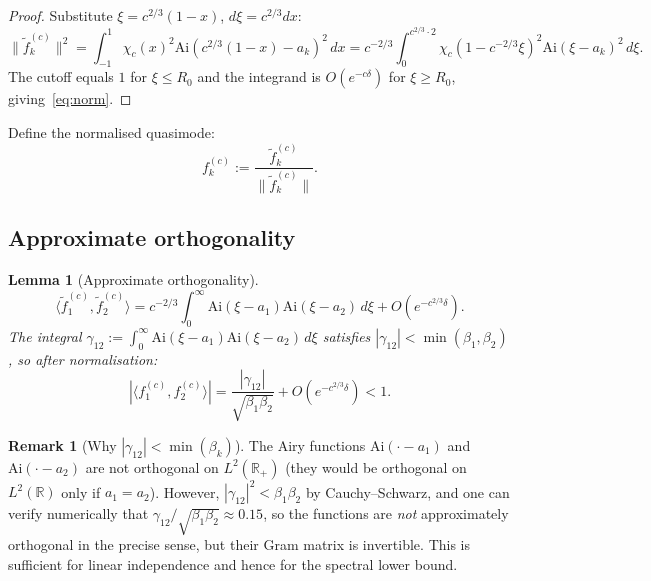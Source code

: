 \documentclass[12pt,a4paper]{amsart}
\newtheorem{lemma}[theorem]{Lemma}
\theoremstyle{definition}
\newtheorem{remark}[theorem]{Remark}
\newcommand{\Ai}{\mathrm{Ai}}
\newcommand{\R}{\mathbb{R}}
\newcommand{\norm}[1]{\|#1\|}
\begin{document}
\begin{proof}
Substitute $\xi = c^{2/3}(1-x)$, $d\xi = c^{2/3}dx$:
\[
  \norm{\tilde f_k^{(c)}}^2
  = \int_{-1}^1 \chi_c(x)^2 \Ai(c^{2/3}(1-x)-a_k)^2\,dx
  = c^{-2/3}\int_0^{c^{2/3}\cdot 2} \chi_c(1-c^{-2/3}\xi)^2
    \Ai(\xi-a_k)^2\,d\xi.
\]
The cutoff equals $1$ for $\xi \leq R_0$ and the integrand is
$O(e^{-c\delta})$ for $\xi \geq R_0$,
giving~\eqref{eq:norm}.
\end{proof}

Define the normalised quasimode:
\begin{equation}\label{eq:normalised}
  f_k^{(c)} := \frac{\tilde f_k^{(c)}}{\norm{\tilde f_k^{(c)}}}.
\end{equation}

\subsection{Approximate orthogonality}

\begin{lemma}[Approximate orthogonality]\label{lem:ortho}
\begin{equation}\label{eq:innerproduct}
  \langle \tilde f_1^{(c)}, \tilde f_2^{(c)}\rangle
  = c^{-2/3}\int_0^\infty \Ai(\xi-a_1)\Ai(\xi-a_2)\,d\xi
  + O(e^{-c^{2/3}\delta}).
\end{equation}
The integral $\gamma_{12} := \int_0^\infty \Ai(\xi-a_1)\Ai(\xi-a_2)\,d\xi$
satisfies $|\gamma_{12}| < \min(\beta_1,\beta_2)$,
so after normalisation:
\begin{equation}\label{eq:approxortho}
  |\langle f_1^{(c)}, f_2^{(c)}\rangle|
  = \frac{|\gamma_{12}|}{\sqrt{\beta_1\beta_2}} + O(e^{-c^{2/3}\delta})
  < 1.
\end{equation}
\end{lemma}

\begin{remark}[Why $|\gamma_{12}| < \min(\beta_k)$]
The Airy functions $\Ai(\cdot - a_1)$ and $\Ai(\cdot - a_2)$
are not orthogonal on $L^2(\R_+)$
(they would be orthogonal on $L^2(\R)$ only if $a_1 = a_2$).
However, $|\gamma_{12}|^2 < \beta_1\beta_2$ by Cauchy--Schwarz,
and one can verify numerically that
$\gamma_{12}/\sqrt{\beta_1\beta_2} \approx 0.15$,
so the functions are \emph{not} approximately orthogonal
in the precise sense, but their Gram matrix is invertible.
This is sufficient for linear independence and hence for
the spectral lower bound.
\end{remark}

\end{document}
